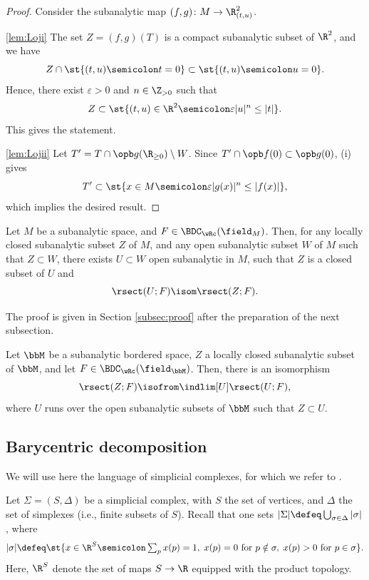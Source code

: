 \begin{proof}
Consider the subanalytic map $(f,g)\colon M\to\R^2_{(t,u)}$.

\eqref{lem:Loji}
The set $Z=(f,g)(T)$ is a compact subanalytic subset of $\R^2$, and we have
\[
Z\cap\st{(t,u)\semicolon t=0}\subset\st{(t,u)\semicolon u=0}.
\]
Hence, there exist $\varepsilon>0$ and $n\in\Z_{>0}$ such that
\[
Z \subset \st{(t,u)\in\R^2\semicolon \varepsilon|u|^n\leq |t|}.
\]
This gives the statement.

\eqref{lem:Lojii}
Let $T'=T\cap\opb g(\R_{\geq 0})\setminus W$. Since $T'\cap\opb f(0)\subset\opb g(0)$, (i) gives
\[
T'\subset\st{x\in M\semicolon \varepsilon|g(x)|^n \leq |f(x)|},
\]
which implies the desired result.
\end{proof}

\begin{theorem}\label{th:subanalytic ext}
Let $M$ be a subanalytic space, and $F\in\BDC_{\wRc}(\field_M)$.
Then, for any locally closed subanalytic subset $Z$ of $M$, and any open subanalytic subset $W$ of $M$ such that $Z\subset W$, there exists
$U\subset W$ open subanalytic in $M$, such that
$Z$ is a closed subset of $U$ and
\[
\rsect(U;F)\isom \rsect(Z;F).
\]
\end{theorem}

The proof is given in Section \ref{subsec:proof}
after the preparation of the next subsection.

\begin{corollary}\label{cor:FKU}
Let $\bbM$ be a subanalytic bordered space,
$Z$ a locally closed subanalytic subset of $\bbM$, and let $F\in\BDC_{\wRc}(\field_\bbM)$.
Then, there is an isomorphism
\[
\rsect(Z;F) \isofrom \indlim[U]\rsect(U;F),
\]
where $U$ runs over the open subanalytic subsets of $\bbM$ such that $Z\subset U$.
\end{corollary}

\subsection {Barycentric decomposition}
We will use here the language of simplicial complexes, for which we refer to \cite[\S8.1]{KS90}.

Let $\Sigma=(S,\Delta)$ be a simplicial complex, with $S$ the set of vertices, and $\Delta$ the set of simplexes (i.e., finite subsets of $S$).
Recall that one sets $|\Sigma|\defeq\bigcup\nolimits_{\sigma\in\Delta}|\sigma|$, where
\[
|\sigma|\defeq\st{x\in\R^S\semicolon \textstyle\sum_p x(p)=1,\;x(p)=0\text{ for }p\notin\sigma,\; x(p)>0\text{ for }p\in\sigma }.
\]
Here, $\R^S$ denote the set of maps $S\to\R$ equipped with the product topology.


